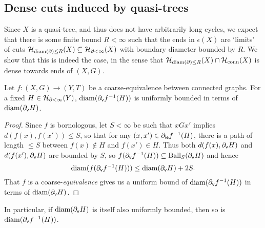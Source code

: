 \documentclass[reqno]{amsart}
\begin{document}
    \subsection{Dense cuts induced by quasi-trees}\label{sec:dense_cuts_induced_by_quasi-trees}

    Since $X$ is a quasi-tree, and thus does not have arbitrarily long cycles, we expect that there is some finite bound $R<\infty$ such that the ends in $\epsilon(X)$ are `limits' of cuts $\mathcal{H}_{\operatorname{diam}(\partial)\leq R}(X)\subseteq\mathcal{H}_{\partial<\infty}(X)$ with boundary diameter bounded by $R$. We show that this is indeed the case, in the sense that $\mathcal{H}_{\operatorname{diam}(\partial)\leq R}(X)\cap\mathcal{H}_\mathrm{conn}(X)$ is dense towards ends of $(X,G)$.

    \begin{lemma}\label{lem:coarse_equivalence_controls_boundary_diameter}
        Let $f:(X,G)\to(Y,T)$ be a coarse-equivalence between connected graphs. For a fixed $H\in\mathcal{H}_{\partial<\infty}(Y)$, $\operatorname{diam}(\partial_\mathsf{v}f^{-1}(H))$ is uniformly bounded in terms of $\operatorname{diam}(\partial_\mathsf{v}H)$.
    \end{lemma}
    \begin{proof}
        Since $f$ is bornologous, let $S<\infty$ be such that $xGx'$ implies $d(f(x),f(x'))\leq S$, so that for any $(x,x')\in\partial_\mathsf{ie}f^{-1}(H)$, there is a path of length $\leq S$ between $f(x)\not\in H$ and $f(x')\in H$. Thus both $d(f(x),\partial_\mathsf{v}H)$ and $d(f(x'),\partial_\mathsf{v}H)$ are bounded by $S$, so $f(\partial_\mathsf{v}f^{-1}(H))\subseteq\operatorname{Ball}_S(\partial_\mathsf{v}H)$ and hence
        \begin{equation*}
            \operatorname{diam}(f(\partial_\mathsf{v}f^{-1}(H)))\leq\operatorname{diam}(\partial_\mathsf{v}H)+2S.
        \end{equation*}
        That $f$ is a coarse-\textit{equivalence} gives us a uniform bound of $\operatorname{diam}(\partial_\mathsf{v}f^{-1}(H))$ in terms of $\operatorname{diam}(\partial_\mathsf{v}H)$.
    \end{proof}

    In particular, if $\operatorname{diam}(\partial_\mathsf{v}H)$ is itself also uniformly bounded, then so is $\operatorname{diam}(\partial_\mathsf{v}f^{-1}(H))$.
\end{document}
